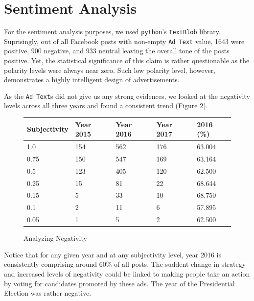 \documentclass[12pt]{article}
\theoremstyle{definition}
\begin{document}

\section*{\centering Sentiment Analysis}

For the sentiment analysis purposes, we used \texttt{python}'s
\texttt{TextBlob} library. Suprisingly, out of all Facebook posts with
non-empty \texttt{Ad Text} value, 1643 were positive, 900 negative, and 933
neutral leaving the overall tone of the posts positive. Yet, the statistical
significance of this claim is rather questionable as the polarity levels were
always near zero. Such low polarity level, however, demonstrates a highly
intelligent design of advertisements.

\bigskip

As the \texttt{Ad Text}s did not give us any strong evidences, we looked at the
negativity levels across all three years and found a consistent trend (Figure 2).

\begin{figure}[H]
\centering
\begin{tabular}{|p{3cm}|p{3cm}|p{3cm}|p{3cm}|p{3cm}|}
 \hline
 Subjectivity & Year 2015 & Year 2016 & Year 2017 & 2016 (\%)\\
 \hline
 1.0  & 154 & 562 & 176 & 63.004\\
 \hline
 0.75 & 150 & 547 & 169 & 63.164\\
 \hline
 0.5  & 123 & 405 & 120 & 62.500\\
 \hline
 0.25 & 15  & 81  & 22  & 68.644\\
 \hline
 0.15 & 5   & 33  & 10  & 68.750\\
 \hline
 0.1  & 2   & 11  & 6   & 57.895\\
 \hline
 0.05 & 1   & 5   & 2   & 62.500\\
 \hline
\end{tabular}
\caption{Analyzing Negativity}
\end{figure}

\bigskip

Notice that for any given year and at any subjectivity level, year 2016 is
consistently comprising around 60\% of all posts. The suddent change in
strategy and increased levels of negativity could be linked to making people
take an action by voting for candidates promoted by these ads. The year of the
Presidential Election was rather negative.
\end{document}
